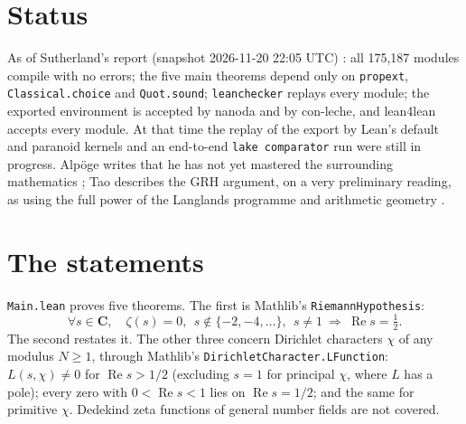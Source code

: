 \documentclass[11pt]{article}
\newcommand{\Lean}[1]{\texttt{\small #1}}
\renewcommand{\Re}{\operatorname{Re}}
\begin{document}
\section{Status}
As of Sutherland's report (snapshot 2026-11-20 22:05 UTC) \cite{sutherland}: all 175{,}187 modules compile with no errors; the five main theorems depend only on \Lean{propext}, \Lean{Classical.choice} and \Lean{Quot.sound}; \Lean{leanchecker} replays every module; the exported environment is accepted by nanoda and by con-leche, and lean4lean accepts every module. At that time the replay of the export by Lean's default and paranoid kernels and an end-to-end \Lean{lake comparator} run were still in progress. Alp\"oge writes that he has not yet mastered the surrounding mathematics \cite{alpoge}; Tao describes the GRH argument, on a very preliminary reading, as using the full power of the Langlands programme and arithmetic geometry \cite{tao}.

\section{The statements}
\Lean{Main.lean} proves five theorems. The first is Mathlib's \Lean{RiemannHypothesis}:
\[
\forall s\in\mathbf C,\quad \zeta(s)=0,\ \ s\notin\{-2,-4,\dots\},\ \ s\neq 1\ \Longrightarrow\ \Re s=\tfrac12 .
\]
The second restates it. The other three concern Dirichlet characters $\chi$ of any modulus $N\ge1$, through Mathlib's \Lean{DirichletCharacter.LFunction}: $L(s,\chi)\ne0$ for $\Re s>1/2$ (excluding $s=1$ for principal $\chi$, where $L$ has a pole); every zero with $0<\Re s<1$ lies on $\Re s=1/2$; and the same for primitive $\chi$. Dedekind zeta functions of general number fields are not covered.
\end{document}
